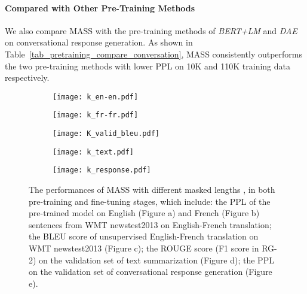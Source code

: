 \documentclass{article}
\begin{document}
	\paragraph{Compared with Other Pre-Training Methods}
	We also compare MASS with the pre-training methods of \textit{BERT+LM} and \textit{DAE} on conversational response generation. As shown in Table~\ref{tab_pretraining_compare_conversation}, MASS consistently outperforms the two pre-training methods with lower PPL on 10K and 110K training data respectively.
	
	\begin{figure*}[!t] 
		\small
		\centering
		
		\begin{subfigure}[h]{0.18\textwidth}
			\centering
			\texttt{[image: k\_en-en.pdf]}
			\vspace{-0.4cm}
			\caption{}
			\label{fig_k_enen_ppl}
		\end{subfigure}
		\begin{subfigure}[h]{0.18\textwidth}
			\centering
			\texttt{[image: k\_fr-fr.pdf]}
			\vspace{-0.4cm}
			\caption{}
			\label{fig_k_frfr_ppl}
		\end{subfigure}
		\begin{subfigure}[h]{0.18\textwidth}
			\centering
			\texttt{[image: K\_valid\_bleu.pdf]}
			\vspace{-0.4cm}
			\caption{}
			\label{fig_k_enfr_bleu}
		\end{subfigure}
		\begin{subfigure}[h]{0.18\textwidth}
			\centering
			\texttt{[image: k\_text.pdf]}
			\vspace{-0.4cm}
			\caption{}
			\label{fig_k_summarization}
		\end{subfigure}
		\begin{subfigure}[h]{0.18\textwidth}
			\centering
			\texttt{[image: k\_response.pdf]}
			\vspace{-0.4cm}
			\caption{}
			\label{fig_k_response}
		\end{subfigure}
		\vspace{-0.2cm}
		\caption{\small The performances of MASS with different masked lengths , in both pre-training and fine-tuning stages, which include: the PPL of the pre-trained model on English (Figure a) and French (Figure b) sentences from WMT newstest2013 on English-French translation; the BLEU score of unsupervised English-French translation on WMT newstest2013 (Figure c); the ROUGE score (F1 score in RG-2) on the validation set of text summarization (Figure d); the PPL on the validation set of conversational response generation (Figure e).}
		\label{fig_mask_ratio}
	\end{figure*}
	
\end{document}
